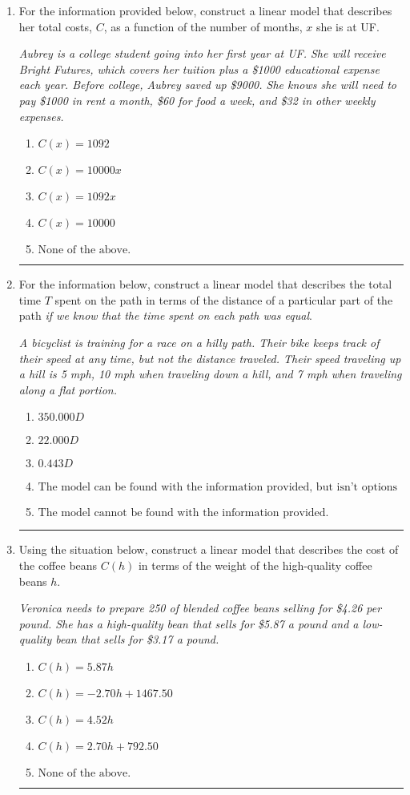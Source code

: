 \documentclass[14pt]{extbook}
\newcommand{\litem}[1]{\item#1\hspace*{-1cm}\rule{\textwidth}{0.4pt}}
\begin{document}
\begin{enumerate}
\litem{
For the information provided below, construct a linear model that describes her total costs, $C$, as a function of the number of months, $x$ she is at UF. 
\begin{center}
    \textit{ Aubrey is a college student going into her first year at UF. She will receive Bright Futures, which covers her tuition plus a \$1000 educational expense each year. Before college, Aubrey saved up \$9000. She knows she will need to pay \$1000 in rent a month, \$60 for food a week, and \$32 in other weekly expenses. }
\end{center}
\begin{enumerate}[label=\Alph*.]
\item \( C(x) = 1092 \)
\item \( C(x) = 10000 x \)
\item \( C(x) = 1092 x \)
\item \( C(x) = 10000 \)
\item \( \text{None of the above.} \)

\end{enumerate} }
\litem{
For the information below, construct a linear model that describes the total time $T$ spent on the path in terms of the distance of a particular part of the path \textit{if we know that the time spent on each path was equal}.
\begin{center}
    \textit{ A bicyclist is training for a race on a hilly path. Their bike keeps track of their speed at any time, but not the distance traveled. Their speed traveling up a hill is 5 mph, 10 mph when traveling down a hill, and 7 mph when traveling along a flat portion. }
\end{center}
\begin{enumerate}[label=\Alph*.]
\item \( 350.000 D \)
\item \( 22.000 D \)
\item \( 0.443 D \)
\item \( \text{The model can be found with the information provided, but isn't options 1-3.} \)
\item \( \text{The model cannot be found with the information provided.} \)

\end{enumerate} }
\litem{
Using the situation below, construct a linear model that describes the cost of the coffee beans $C(h)$ in terms of the weight of the high-quality coffee beans $h$.
\begin{center}
    \textit{ Veronica needs to prepare 250 of blended coffee beans selling for \$4.26 per pound. She has a high-quality bean that sells for \$5.87 a pound and a low-quality bean that sells for \$3.17 a pound. }
\end{center}
\begin{enumerate}[label=\Alph*.]
\item \( C(h) = 5.87 h \)
\item \( C(h) = -2.70 h + 1467.50 \)
\item \( C(h) = 4.52 h \)
\item \( C(h) = 2.70 h + 792.50 \)
\item \( \text{None of the above.} \)


\end{enumerate}}
\end{enumerate}
\end{document}
